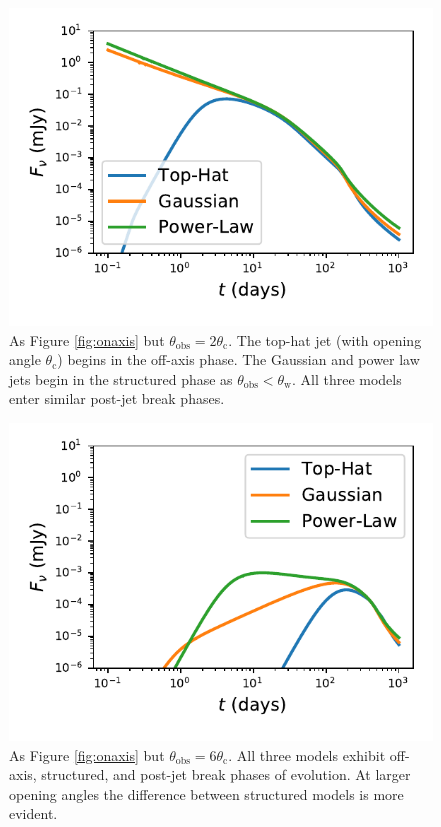 \documentclass[twocolumn]{aastex62}
\newcommand{\thobs}{\ensuremath{\theta_{\mathrm{obs}}}}
\newcommand{\thW}{\ensuremath{\theta_{\mathrm{w}}}}
\newcommand{\thC}{\ensuremath{\theta_{\mathrm{c}}}}
\begin{document}
\begin{figure}
	\includegraphics[width=\columnwidth]{figs/lc_off1.pdf}
	\caption{As Figure \ref{fig:onaxis} but $\thobs = 2\thC$.  The top-hat jet (with opening angle $\thC$) begins in the off-axis phase.  The Gaussian and power law jets begin in the structured phase as $\thobs < \thW$.  All three models enter similar post-jet break phases. \label{fig:offaxis1}}
\end{figure}
\begin{figure}
	\includegraphics[width=\columnwidth]{figs/lc_off2.pdf}
	\caption{As Figure \ref{fig:onaxis} but $\thobs = 6\thC$. All three models exhibit off-axis, structured, and post-jet break phases of evolution.  At larger opening angles the difference between structured models is more evident.  \label{fig:offaxis2}}
\end{figure}
\end{document}
